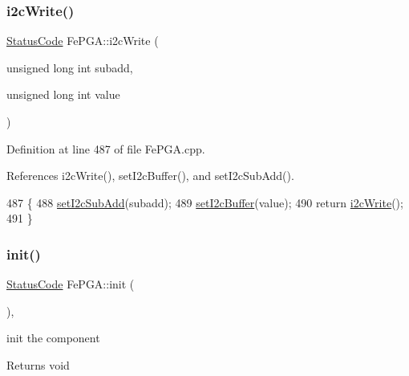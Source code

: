 \mbox{\label{classFePGA_a45e1cfdf1f303f3958bf6a83c4e8039b}} 
\subsubsection{\texorpdfstring{i2c\+Write()}{i2cWrite()}\hspace{0.1cm}{\footnotesize\ttfamily [2/2]}}
{\footnotesize\ttfamily \hyperlink{classStatusCode}{Status\+Code} Fe\+P\+G\+A\+::i2c\+Write (\begin{DoxyParamCaption}\item[{unsigned long int}]{subadd,  }\item[{unsigned long int}]{value }\end{DoxyParamCaption})}



Definition at line 487 of file Fe\+P\+G\+A.\+cpp.



References i2c\+Write(), set\+I2c\+Buffer(), and set\+I2c\+Sub\+Add().


\begin{DoxyCode}
487                                                                            \{
488   \hyperlink{classFePGA_a37c1ee5bf89667c641f321479697166f}{setI2cSubAdd}(subadd);
489   \hyperlink{classFePGA_aaf52ed549f6b79d53f49c3f85c5fbad2}{setI2cBuffer}(value);
490   \textcolor{keywordflow}{return} \hyperlink{classFePGA_a27b9c9bb486cea35b1bbcac5da96f527}{i2cWrite}();
491 \}
\end{DoxyCode}
\mbox{\label{classFePGA_a5355858b1b8deedcc12acff80f025804}} 
\subsubsection{\texorpdfstring{init()}{init()}}
{\footnotesize\ttfamily \hyperlink{classStatusCode}{Status\+Code} Fe\+P\+G\+A\+::init (\begin{DoxyParamCaption}{ }\end{DoxyParamCaption})\hspace{0.3cm}{\ttfamily [inline]}, {\ttfamily [virtual]}}

init the component

\begin{DoxyReturn}{Returns}
void 
\end{DoxyReturn}


